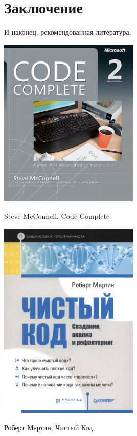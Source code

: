 \documentclass[a5paper]{article}
\begin{document}
\section{Заключение}

И наконец, рекомендованная литература:

\begin{center}
    \includegraphics[width=0.5\textwidth]{codeCompleteCover.png}
\end{center}

Steve McConnell, Code Complete

\begin{center}
    \includegraphics[width=0.5\textwidth]{cleanCodeCover.png}
\end{center}

Роберт Мартин, Чистый Код
\end{document}
